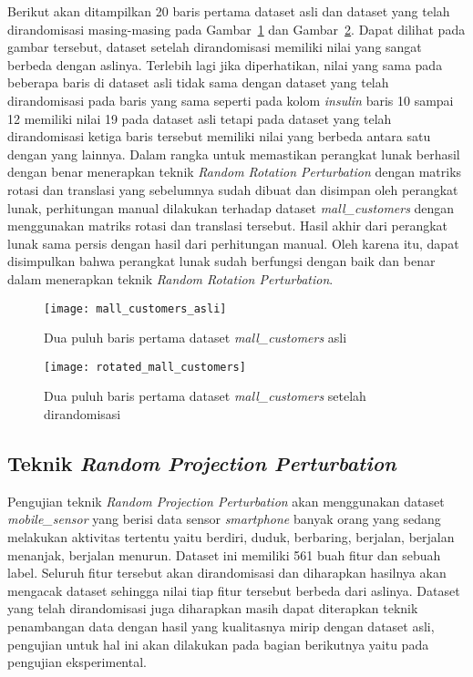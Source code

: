 Berikut akan ditampilkan 20 baris pertama dataset asli dan dataset yang telah dirandomisasi masing-masing pada Gambar~\ref{fig:mall_customers_asli} dan Gambar~\ref{fig:rotated_mall_customers}. Dapat dilihat pada gambar tersebut, dataset setelah dirandomisasi memiliki nilai yang sangat berbeda dengan aslinya. Terlebih lagi jika diperhatikan, nilai yang sama pada beberapa baris di dataset asli tidak sama dengan dataset yang telah dirandomisasi pada baris yang sama seperti pada kolom \textit{insulin} baris 10 sampai 12 memiliki nilai 19 pada dataset asli tetapi pada dataset yang telah dirandomisasi ketiga baris tersebut memiliki nilai yang berbeda antara satu dengan yang lainnya. Dalam rangka untuk memastikan perangkat lunak berhasil dengan benar menerapkan teknik \textit{Random Rotation Perturbation} dengan matriks rotasi dan translasi yang sebelumnya sudah dibuat dan disimpan oleh perangkat lunak, perhitungan manual dilakukan terhadap dataset \textit{mall\_customers} dengan menggunakan matriks rotasi dan translasi tersebut. Hasil akhir dari perangkat lunak sama persis dengan hasil dari perhitungan manual. Oleh karena itu, dapat disimpulkan bahwa perangkat lunak sudah berfungsi dengan baik dan benar dalam menerapkan teknik \textit{Random Rotation Perturbation}.

\begin{figure}
	\centering
	\texttt{[image: mall\_customers\_asli]}
	\caption{Dua puluh baris pertama dataset \textit{mall\_customers} asli}
	\label{fig:mall_customers_asli}
\end{figure}

\begin{figure}
	\centering
	\texttt{[image: rotated\_mall\_customers]}
	\caption{Dua puluh baris pertama dataset \textit{mall\_customers} setelah dirandomisasi}
	\label{fig:rotated_mall_customers}
\end{figure}

\subsection{Teknik \textit{Random Projection Perturbation}}
\label{subsec:rpp-fungsional}

Pengujian teknik \textit{Random Projection Perturbation} akan menggunakan dataset \textit{mobile\_sensor} yang berisi data sensor \textit{smartphone} banyak orang yang sedang melakukan aktivitas tertentu yaitu berdiri, duduk, berbaring, berjalan, berjalan menanjak, berjalan menurun. Dataset ini memiliki 561 buah fitur dan sebuah label. Seluruh fitur tersebut akan dirandomisasi dan diharapkan hasilnya akan mengacak dataset sehingga nilai tiap fitur tersebut berbeda dari aslinya. Dataset yang telah dirandomisasi juga diharapkan masih dapat diterapkan teknik penambangan data dengan hasil yang kualitasnya mirip dengan dataset asli, pengujian untuk hal ini akan dilakukan pada bagian berikutnya yaitu pada pengujian eksperimental.

